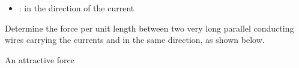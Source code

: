 \begin{ELjoin}

\begin{itemize}
\tightlist
\item
  \ELim{\dif\vect{\ell}}: in the direction of the current
\end{itemize}


\begin{ELexample}{}

Determine the force per unit length between two very long parallel conducting wires carrying the currents  and  in the same direction, as shown below.


\begin{ELsolution}


\begin{ELimportant}{An attractive force}


\end{ELimportant}

\end{ELsolution}

\end{ELexample}

\end{ELjoin}

